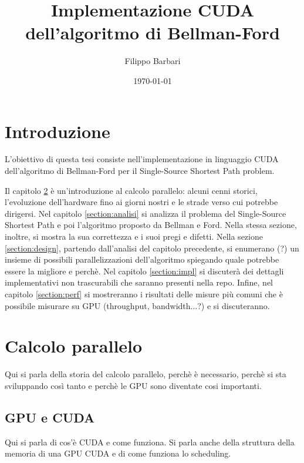 \documentclass{article}
\title{Implementazione CUDA dell'algoritmo di Bellman-Ford}
\author{Filippo Barbari}
\date{\today}
\begin{document}
	
	\maketitle
	\newpage
	
	\tableofcontents
	\newpage
	
	\listoffigures
	\newpage
	
	\listoftables
	\newpage
	
	\listofalgorithms
	\newpage
	
	\section{Introduzione}
	L'obiettivo di questa tesi consiste nell'implementazione in linguaggio CUDA dell'algoritmo di Bellman-Ford per il Single-Source Shortest Path problem.
	
	Il capitolo \ref{section:storia} è un'introduzione al calcolo parallelo: alcuni cenni storici, l'evoluzione dell'hardware fino ai giorni nostri e le strade verso cui potrebbe dirigersi. Nel capitolo \ref{section:analisi} si analizza il problema del Single-Source Shortest Path e poi l'algoritmo proposto da Bellman e Ford. Nella stessa sezione, inoltre, si mostra la sua correttezza e i suoi pregi e difetti. Nella sezione \ref{section:design}, partendo dall'analisi del capitolo precedente, si enumerano (?) un insieme di possibili parallelizzazioni dell'algoritmo spiegando quale potrebbe essere la migliore e perchè. Nel capitolo \ref{section:impl} si discuterà dei dettagli implementativi non trascurabili che saranno presenti nella repo. Infine, nel capitolo \ref{section:perf} si mostreranno i risultati delle misure più comuni che è possibile misurare su GPU (throughput, bandwidth...?) e si discuteranno.
	
	\section{Calcolo parallelo}
	\label{section:storia}
	Qui si parla della storia del calcolo parallelo, perchè è necessario, perchè si sta sviluppando così tanto e perchè le GPU sono diventate cosi importanti.
	
	\subsection{GPU e CUDA}
	Qui si parla di cos'è CUDA e come funziona. Si parla anche della struttura della memoria di una GPU CUDA e di come funziona lo scheduling.
	
\end{document}

